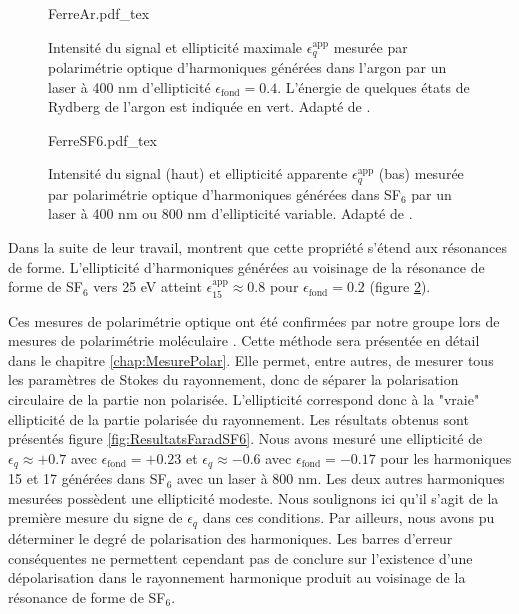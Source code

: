 \begin{figure}
\centering
\def\svgwidth{\textwidth}
{FerreAr.pdf_tex}
\caption{Intensité du signal et ellipticité maximale $\epsilon_q^{\text{app}}$ mesurée par polarimétrie optique d'harmoniques générées dans l'argon par un laser à 400 nm d'ellipticité $\epsilon_{\text{fond}} = 0.4$. L'énergie de quelques états de Rydberg de l'argon est indiquée en vert. Adapté de .}
\label{fig:FerreAr}
\end{figure}

\begin{figure}
\centering
\def\svgwidth{\textwidth}
{FerreSF6.pdf_tex}
\caption{Intensité du signal (haut) et ellipticité apparente $\epsilon_q^{\text{app}}$ (bas) mesurée par polarimétrie optique d'harmoniques générées dans SF$_6$ par un laser à 400 nm ou 800 nm d'ellipticité variable. Adapté de .}
\label{fig:FerreSF6}
\end{figure}

Dans la suite de leur travail,  montrent que cette propriété s'étend aux résonances de forme. L'ellipticité d'harmoniques générées au voisinage de la résonance de forme de SF$_6$ vers 25 eV   atteint $\epsilon_{15}^{\text{app}} \approx 0.8$ pour $\epsilon_{\text{fond}} = 0.2$ (figure \ref{fig:FerreSF6}).

Ces mesures de polarimétrie optique ont été confirmées par notre groupe lors de mesures de polarimétrie moléculaire  . Cette méthode sera présentée en détail dans le chapitre \ref{chap:MesurePolar}. Elle permet, entre autres, de mesurer tous les paramètres de Stokes du rayonnement, donc de séparer la polarisation circulaire de la partie non polarisée. L'ellipticité correspond donc à la "vraie" ellipticité de la partie polarisée du rayonnement. Les résultats obtenus sont présentés figure \ref{fig:ResultatsFaradSF6}. Nous avons mesuré une ellipticité de $\epsilon_q \approx +0.7$ avec $\epsilon_{\text{fond}} = +0.23$ et $\epsilon_q \approx -0.6$ avec $\epsilon_{\text{fond}} = -0.17$ pour les harmoniques 15 et 17 générées dans SF$_6$ avec un laser à 800 nm. Les deux autres harmoniques mesurées possèdent une ellipticité modeste. Nous soulignons ici qu'il s'agit de la première mesure du signe de $\epsilon_q$ dans ces conditions. Par ailleurs, nous avons pu déterminer le degré de polarisation des harmoniques. Les barres d'erreur conséquentes ne permettent cependant pas de conclure sur l'existence d'une dépolarisation dans le rayonnement harmonique produit au voisinage de la résonance de forme de SF$_6$.

